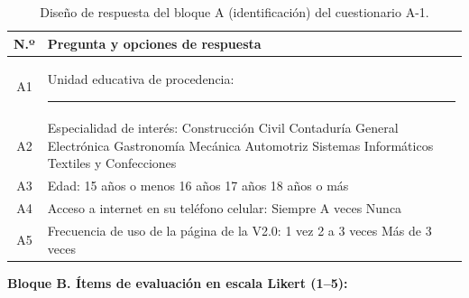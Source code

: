 \begin{table}[htbp]
    \centering
    \caption{Diseño de respuesta del bloque A (identificación) del cuestionario A-1.}
    \label{tab:a1_identificacion}
    \begin{tabularx}{\textwidth}{c L}
        \toprule
        \textbf{N.º} & \textbf{Pregunta y opciones de respuesta} \\
        \midrule
        A1 & Unidad educativa de procedencia: \rule[-2pt]{4.5cm}{0.4pt} \\
        A2 & Especialidad de interés: \casilla{} Construcción Civil \quad \casilla{} Contaduría General \quad \casilla{} Electrónica \quad \casilla{} Gastronomía \quad \casilla{} Mecánica Automotriz \quad \casilla{} Sistemas Informáticos \quad \casilla{} Textiles y Confecciones \\
        A3 & Edad: \casilla{} 15 años o menos \quad \casilla{} 16 años \quad \casilla{} 17 años \quad \casilla{} 18 años o más \\
        A4 & Acceso a internet en su teléfono celular: \casilla{} Siempre \quad \casilla{} A veces \quad \casilla{} Nunca \\
        A5 & Frecuencia de uso de la página de la V2.0: \casilla{} 1 vez \quad \casilla{} 2 a 3 veces \quad \casilla{} Más de 3 veces \\
        \bottomrule
    \end{tabularx}
\end{table}

\noindent\textbf{Bloque B. Ítems de evaluación en escala Likert (1--5):}

